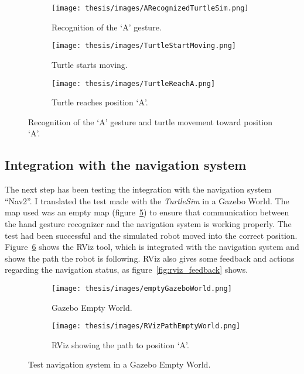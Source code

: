 \documentclass[../thesis.tex]{subfiles}
\begin{document}
\begin{figure}[H]
     \centering
     \begin{subfigure}[b]{0.45\textwidth}
         \centering
         \texttt{[image: thesis/images/ARecognizedTurtleSim.png]}
         \caption{Recognition of the `A' gesture.}
         \label{fig:A_gesture_recognition_turtlesim}
     \end{subfigure}
     \hfill
     \begin{subfigure}[b]{0.45\textwidth}
         \centering
         \texttt{[image: thesis/images/TurtleStartMoving.png]}
         \caption{Turtle starts moving.}
         \label{fig:turtle_start_turtle_sim}
     \end{subfigure}
     \hfill
     \begin{subfigure}[b]{0.45\textwidth}
         \centering
         \texttt{[image: thesis/images/TurtleReachA.png]}
         \caption{Turtle reaches position `A'.}
         \label{fig:turtle_reach_A_position.}
     \end{subfigure}
        \caption{Recognition of the `A' gesture and turtle movement toward position `A'.}
        \label{fig:example_to_A_turtlesim}
\end{figure}

\subsection{Integration with the navigation system}
The next step has been testing the integration with the navigation system ``Nav2''. I translated the test made with the \textit{TurtleSim} in a Gazebo World. The map used was an empty map (figure~\ref{fig:gazebo_empty_world}) to ensure that communication between the hand gesture recognizer and the navigation system is working properly. The test had been successful and the simulated robot moved into the correct position. Figure~\ref{fig:rviz_emptyworld} shows the RViz tool, which is integrated with the navigation system and shows the path the robot is following. RViz also gives some feedback and actions regarding the navigation status, as figure~\ref{fig:rviz_feedback} shows.

\begin{figure}[H]
    \centering
    \begin{subfigure}[b]{0.45\textwidth}
        \centering
        \texttt{[image: thesis/images/emptyGazeboWorld.png]}
        \caption{Gazebo Empty World.}
        \label{fig:gazebo_empty_world}
    \end{subfigure}
    \hfill
    \begin{subfigure}[b]{0.45\textwidth}
        \centering
        \texttt{[image: thesis/images/RVizPathEmptyWorld.png]}
        \caption{RViz showing the path to position `A'.}
        \label{fig:rviz_emptyworld}
    \end{subfigure}
    \caption{Test navigation system in a Gazebo Empty World.}
    \label{fig:navigation_empty_gazebo_world}
\end{figure}
\end{document}
